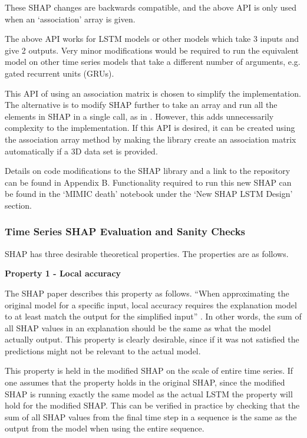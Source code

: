 \documentclass[12pt]{article}
\begin{document}
These SHAP changes are backwards compatible, and the above API is only used when an `association' array is given. 

The above API works for LSTM models or other models which take 3 inputs and give 2 outputs. Very minor modifications would be required to run the equivalent model on other time series models that take a different number of arguments, e.g. gated recurrent units (GRUs).

This API of using an association matrix is chosen to simplify the implementation. The alternative is to modify SHAP further to take an array and run all the elements in SHAP in a single call, as in \cite{TimeSeriesSHAP}. However, this adds unnecessarily complexity to the implementation. If this API is desired, it can be created using the association array method by making the library create an association matrix automatically if a 3D data set is provided. 

Details on code modifications to the SHAP library and a link to the repository can be found in Appendix B. Functionality required to run this new SHAP can be found in the `MIMIC death' notebook under the `New SHAP LSTM Design' section. 

\subsubsection{Time Series SHAP Evaluation and Sanity Checks}

SHAP has three desirable theoretical properties. The properties are as follows.

\textbf{Property 1 - Local accuracy}

The SHAP paper describes this property as follows. ``When approximating the original model for a specific input, local accuracy requires the explanation model to at least match the output for the simplified input'' \cite{SHAP}. In other words, the sum of all SHAP values in an explanation should be the same as what the model actually output. This property is clearly desirable, since if it was not satisfied the predictions might not be relevant to the actual model. 

This property is held in the modified SHAP on the scale of entire time series. If one assumes that the property holds in the original SHAP, since the modified SHAP is running exactly the same model as the actual LSTM the property will hold for the modified SHAP. This can be verified in practice by checking that the sum of all SHAP values from the final time step in a sequence is the same as the output from the model when using the entire sequence.
\end{document}
